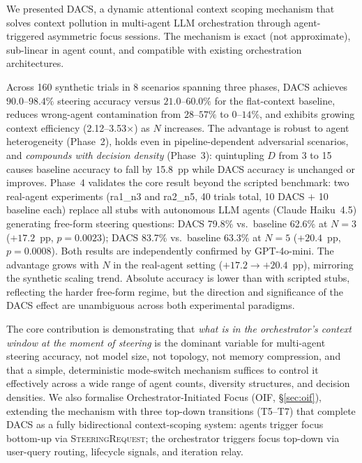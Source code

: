 \documentclass{article}
\begin{document}
We presented DACS, a dynamic attentional context scoping mechanism that
solves context pollution in multi-agent LLM orchestration through
agent-triggered asymmetric focus sessions.
The mechanism is exact (not approximate), sub-linear in agent count, and
compatible with existing orchestration architectures.

Across 160 synthetic trials in 8 scenarios spanning three phases,
DACS achieves $90.0$--$98.4\%$ steering accuracy versus $21.0$--$60.0\%$
for the flat-context baseline, reduces wrong-agent contamination from
$28$--$57\%$ to $0$--$14\%$, and exhibits growing context efficiency
(2.12--3.53$\times$) as $N$ increases.
The advantage is robust to agent heterogeneity (Phase~2), holds even in
pipeline-dependent adversarial scenarios, and \emph{compounds with
decision density} (Phase~3): quintupling $D$ from 3 to 15 causes baseline
accuracy to fall by 15.8~pp while DACS accuracy is unchanged or improves.
Phase~4 validates the core result beyond the scripted benchmark:
two real-agent experiments (ra1\_n3 and ra2\_n5, 40 trials total,
10 DACS $+$ 10 baseline each) replace all stubs with autonomous LLM
agents (Claude Haiku~4.5) generating free-form steering questions:
DACS 79.8\% vs.\ baseline 62.6\% at $N{=}3$ ($+17.2$~pp, $p{=}0.0023$);
DACS 83.7\% vs.\ baseline 63.3\% at $N{=}5$ ($+20.4$~pp, $p{=}0.0008$).
Both results are independently confirmed by GPT-4o-mini.
The advantage grows with $N$ in the real-agent setting ($+17.2 \to +20.4$~pp),
mirroring the synthetic scaling trend.
Absolute accuracy is lower than with scripted stubs, reflecting the
harder free-form regime, but the direction and significance of the
DACS effect are unambiguous across both experimental paradigms.

The core contribution is demonstrating that \emph{what is in the
orchestrator's context window at the moment of steering} is the
dominant variable for multi-agent steering accuracy, not model size,
not topology, not memory compression, and that a simple, deterministic
mode-switch mechanism suffices to control it effectively across a
wide range of agent counts, diversity structures, and decision densities.
We also formalise Orchestrator-Initiated Focus (OIF, \S\ref{sec:oif}),
extending the mechanism with three top-down transitions (T5--T7) that
complete DACS as a fully bidirectional context-scoping system:
agents trigger focus bottom-up via \textsc{SteeringRequest}; the
orchestrator triggers focus top-down via user-query routing,
lifecycle signals, and iteration relay.



\end{document}
